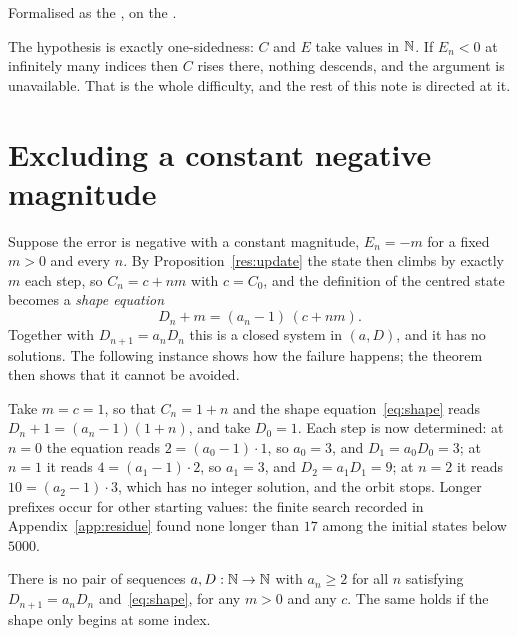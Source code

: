 \documentclass[11pt]{article}
\begin{document}
\noindent Formalised as the
, on the
.

The hypothesis is exactly one-sidedness: $C$ and $E$ take values in $\mathbb{N}$.  If
$E_n<0$ at infinitely many indices then $C$ rises there, nothing descends, and
the argument is unavailable.  That is the whole difficulty, and the rest of
this note is directed at it.

\section{Excluding a constant negative magnitude}\label{sec:constant}

Suppose the error is negative with a constant magnitude, $E_n=-m$ for a fixed
$m>0$ and every $n$.  By
Proposition~\ref{res:update} the state then climbs by exactly $m$ each step,
so $C_n=c+nm$ with $c=C_0$, and the definition of the centred state becomes a
\emph{shape equation}
\[
 D_n+m=(a_n-1)\,(c+nm) .
\tag{5.1}\label{eq:shape}
\]
Together with $D_{n+1}=a_nD_n$ this is a closed system in $(a,D)$, and it has
no solutions.  The following instance shows how the failure happens; the
theorem then shows that it cannot be avoided.

\begin{example}\label{ex:shape}
Take $m=c=1$, so that $C_n=1+n$ and the shape equation~\eqref{eq:shape} reads
$D_n+1=(a_n-1)(1+n)$, and take $D_0=1$.  Each step is now determined: at $n=0$
the equation reads $2=(a_0-1)\cdot1$, so $a_0=3$, and $D_1=a_0D_0=3$; at $n=1$
it reads $4=(a_1-1)\cdot2$, so $a_1=3$, and $D_2=a_1D_1=9$; at $n=2$ it reads
$10=(a_2-1)\cdot3$, which has no integer solution, and the orbit stops.
Longer prefixes occur for other starting values: the finite search recorded in
Appendix~\ref{app:residue} found none longer than $17$ among the initial
states below $5000$.
\end{example}

\begin{theorem}\label{res:constant}
There is no pair of sequences $a,D:\mathbb{N}\to\mathbb{N}$ with $a_n\ge2$ for all $n$
satisfying $D_{n+1}=a_nD_n$ and~\eqref{eq:shape}, for any $m>0$ and any
$c$.  The same holds if the shape only begins at some index.
\end{theorem}
\end{document}
